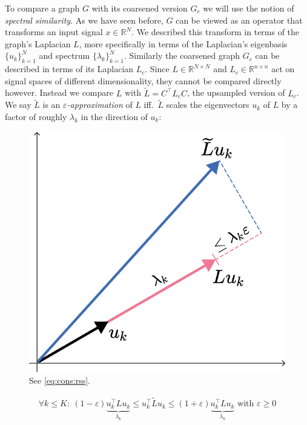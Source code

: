 To compare a graph $G$ with its coarsened version $G_c$ we will use the notion of \textit{spectral similarity}.
As we have seen before, $G$ can be viewed as an operator that transforms an input signal $x \in \mathbb{R}^N$.
We described this transform in terms of the graph's Laplacian $L$,
more specifically in terms of the Laplacian's eigenbasis ${\{ u_k \}}_{k = 1}^{N}$ and spectrum ${\{ \lambda_k \}}_{k = 1}^{N}$.
Similarly the coarsened graph $G_c$ can be described in terms of its Laplacian $L_c$.
Since $L \in \mathbb{R}^{N \times N}$ and $L_c \in \mathbb{R}^{n \times n}$ act on signal spaces of different dimensionality, they cannot be compared directly however.
Instead we compare $L$ with $\widetilde{L} = C^{\top} L_c C$, the upsampled version of $L_c$.
We say $\widetilde{L}$ is an \textit{$\varepsilon$-approximation} of $L$ iff.\  $\widetilde{L}$ scales the eigenvectors $u_k$ of $L$ by a factor of roughly $\lambda_k$ in the direction of $u_k$:
\begin{figure}
	\centering
	\includegraphics[width=\linewidth]{gfx/cons/rss.pdf}
	\caption{See \cref{eq:cons:rss}.}\label{fig:cons:rss}
\end{figure}
\begin{align}
	\forall k \leq K:\ (1 - \varepsilon) \underbrace{u_k^{\top} L u_k}_{\lambda_k} \leq u_k^{\top} \widetilde{L} u_k \leq (1 + \varepsilon) \underbrace{u_k^{\top} L u_k}_{\lambda_k} \text{ with } \varepsilon \geq 0\label{eq:cons:rss}
\end{align}

